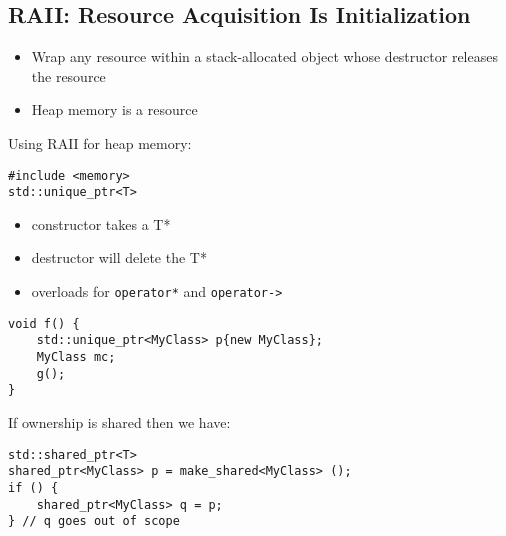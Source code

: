 \documentclass[12pt]{article}
\begin{document}
\subsection{RAII: Resource Acquisition Is Initialization}
\begin{itemize}
    \item Wrap any resource within a stack-allocated object whose destructor releases the resource
    \item Heap memory is a resource
\end{itemize}
Using RAII for heap memory:
\begin{lstlisting}
#include <memory>
std::unique_ptr<T>
\end{lstlisting}
\begin{itemize}
    \item constructor takes a T*
    \item destructor will delete the T*
    \item overloads for \lstinline{operator*} and \lstinline{operator->}
\end{itemize}
\begin{lstlisting}
void f() {
    std::unique_ptr<MyClass> p{new MyClass};
    MyClass mc;
    g();
}
\end{lstlisting}
If ownership is shared then we have:
\begin{lstlisting}
std::shared_ptr<T>
shared_ptr<MyClass> p = make_shared<MyClass> ();
if () {
    shared_ptr<MyClass> q = p;
} // q goes out of scope
\end{lstlisting}
\end{document}
